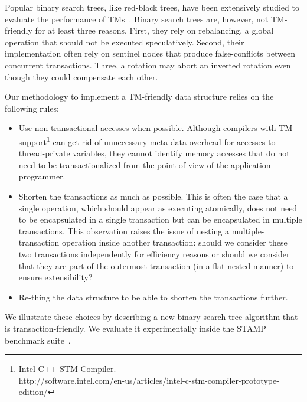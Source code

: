 \documentclass[10pt]{sigplanconf}
\begin{document}
Popular binary search trees, like red-black trees, have been extensively 
studied to evaluate the performance of TMs~\cite{ST95,HLMS03,HK08,FFR08,DFGG11}.
Binary search trees are, however, not TM-friendly for at least three reasons. 
First, they rely on rebalancing, a global operation that should not be 
executed speculatively. Second, their implementation often rely on sentinel 
nodes that produce false-conflicts between concurrent transactions. Three, 
a rotation may abort an inverted rotation even though they could compensate 
each other.

Our methodology to implement a TM-friendly data structure relies on the following rules:
\begin{itemize}
	\item Use non-transactional accesses when possible. Although compilers with TM support\footnote{Intel C++ STM Compiler.\\http://software.intel.com/en-us/articles/intel-c-stm-compiler-prototype-edition/} can get rid of 
	unnecessary meta-data overhead for accesses to thread-private variables, they cannot identify memory accesses that do not need to 
	be transactionalized from the point-of-view of the application programmer.
	\item Shorten the transactions as much as possible. This is often the case that a single operation, which should appear as executing 
	atomically, does not need to be encapsulated in a single transaction but can be encapsulated in multiple transactions. This observation raises the issue
	of nesting a multiple-transaction operation inside another transaction: should we consider these two transactions independently
	for efficiency reasons or should we consider that they are part of the outermost transaction (in a flat-nested manner) to ensure 
	extensibility?
	\item Re-thing the data structure to be able to shorten the transactions further.
\end{itemize}
We illustrate these choices by describing a new binary search tree algorithm
that is transaction-friendly. We evaluate it experimentally inside the 
STAMP benchmark suite~\cite{CCKO08}.  
\end{document}
